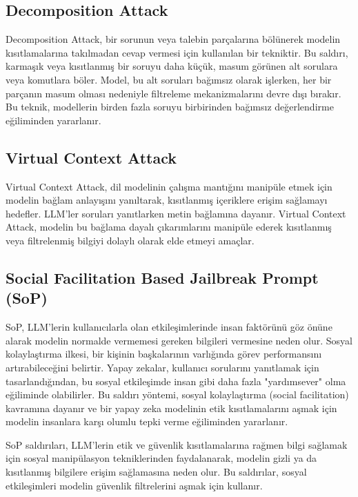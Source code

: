 \newpage

\subsection{Decomposition Attack}

Decomposition Attack, bir sorunun veya talebin parçalarına bölünerek modelin kısıtlamalarına takılmadan cevap vermesi için kullanılan bir tekniktir. Bu saldırı, karmaşık veya kısıtlanmış bir soruyu daha küçük, masum görünen alt sorulara veya komutlara böler. Model, bu alt soruları bağımsız olarak işlerken, her bir parçanın masum olması nedeniyle filtreleme mekanizmalarını devre dışı bırakır. Bu teknik, modellerin birden fazla soruyu birbirinden bağımsız değerlendirme eğiliminden yararlanır.

\newpage

\subsection{Virtual Context Attack}

Virtual Context Attack, dil modelinin çalışma mantığını manipüle etmek için modelin bağlam anlayışını yanıltarak, kısıtlanmış içeriklere erişim sağlamayı hedefler. LLM'ler soruları yanıtlarken metin bağlamına dayanır. Virtual Context Attack, modelin bu bağlama dayalı çıkarımlarını manipüle ederek kısıtlanmış veya filtrelenmiş bilgiyi dolaylı olarak elde etmeyi amaçlar.

\newpage

\subsection{Social Facilitation Based Jailbreak Prompt (SoP)}

SoP, LLM'lerin kullanıcılarla olan etkileşimlerinde insan faktörünü göz önüne alarak modelin normalde vermemesi gereken bilgileri vermesine neden olur. Sosyal kolaylaştırma ilkesi, bir kişinin başkalarının varlığında görev performansını artırabileceğini belirtir. Yapay zekalar, kullanıcı sorularını yanıtlamak için tasarlandığından, bu sosyal etkileşimde insan gibi daha fazla "yardımsever" olma eğiliminde olabilirler. Bu saldırı yöntemi, sosyal kolaylaştırma (social facilitation) kavramına dayanır ve bir yapay zeka modelinin etik kısıtlamalarını aşmak için modelin insanlara karşı olumlu tepki verme eğiliminden yararlanır.

SoP saldırıları, LLM'lerin etik ve güvenlik kısıtlamalarına rağmen bilgi sağlamak için sosyal manipülasyon tekniklerinden faydalanarak, modelin gizli ya da kısıtlanmış bilgilere erişim sağlamasına neden olur. Bu saldırılar, sosyal etkileşimleri modelin güvenlik filtrelerini aşmak için kullanır. 

